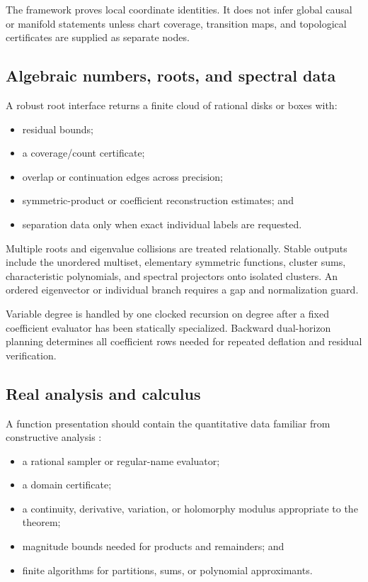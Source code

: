 The framework proves local coordinate identities.  It does not infer global causal or
manifold statements unless chart coverage, transition maps, and topological
certificates are supplied as separate nodes.

\subsection{Algebraic numbers, roots, and spectral data}

A robust root interface returns a finite cloud of rational disks or boxes with:

\begin{itemize}
\item residual bounds;
\item a coverage/count certificate;
\item overlap or continuation edges across precision;
\item symmetric-product or coefficient reconstruction estimates; and
\item separation data only when exact individual labels are requested.
\end{itemize}

Multiple roots and eigenvalue collisions are treated relationally.  Stable outputs
include the unordered multiset, elementary symmetric functions, cluster sums,
characteristic polynomials, and spectral projectors onto isolated clusters.  An
ordered eigenvector or individual branch requires a gap and normalization guard.

Variable degree is handled by one clocked recursion on degree after a fixed coefficient
evaluator has been statically specialized.  Backward dual-horizon planning determines
all coefficient rows needed for repeated deflation and residual verification.

\subsection{Real analysis and calculus}

A function presentation should contain the quantitative data familiar from constructive analysis \cite{bishopbridges1985,troelstravanDalen1988}:

\begin{itemize}
\item a rational sampler or regular-name evaluator;
\item a domain certificate;
\item a continuity, derivative, variation, or holomorphy modulus appropriate to the
theorem;
\item magnitude bounds needed for products and remainders; and
\item finite algorithms for partitions, sums, or polynomial approximants.
\end{itemize}

